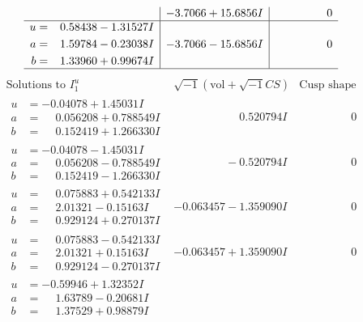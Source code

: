 \documentclass[1p]{elsarticle_modified}
\theoremstyle{definition}
\newcommand{\I}{\sqrt{-1}}
\begin{document}
$$\begin{array}{c|c|c}
 & -3.7066 + 15.6856 I & \phantom{-0.000000 } 0 \\ \hline\begin{aligned}
u &= \phantom{-}0.58438 - 1.31527 I \\
a &= \phantom{-}1.59784 - 0.23038 I \\
b &= \phantom{-}1.33960 + 0.99674 I\end{aligned}
 & -3.7066 - 15.6856 I & \phantom{-0.000000 } 0\\
 \hline 
 \end{array}$$\newpage$$\begin{array}{c|c|c}  
\text{Solutions to }I^u_{1}& \I (\text{vol} + \sqrt{-1}CS) & \text{Cusp shape}\\
 \hline 
\begin{aligned}
u &= -0.04078 + 1.45031 I \\
a &= \phantom{-}0.056208 + 0.788549 I \\
b &= \phantom{-}0.152419 + 1.266330 I\end{aligned}
 & \phantom{-0.000000 -}0.520794 I & \phantom{-0.000000 } 0 \\ \hline\begin{aligned}
u &= -0.04078 - 1.45031 I \\
a &= \phantom{-}0.056208 - 0.788549 I \\
b &= \phantom{-}0.152419 - 1.266330 I\end{aligned}
 & \phantom{-0.000000 } -0.520794 I & \phantom{-0.000000 } 0 \\ \hline\begin{aligned}
u &= \phantom{-}0.075883 + 0.542133 I \\
a &= \phantom{-}2.01321 - 0.15163 I \\
b &= \phantom{-}0.929124 + 0.270137 I\end{aligned}
 & -0.063457 - 1.359090 I & \phantom{-0.000000 } 0 \\ \hline\begin{aligned}
u &= \phantom{-}0.075883 - 0.542133 I \\
a &= \phantom{-}2.01321 + 0.15163 I \\
b &= \phantom{-}0.929124 - 0.270137 I\end{aligned}
 & -0.063457 + 1.359090 I & \phantom{-0.000000 } 0 \\ \hline\begin{aligned}
u &= -0.59946 + 1.32352 I \\
a &= \phantom{-}1.63789 - 0.20681 I \\
b &= \phantom{-}1.37529 + 0.98879 I\end{aligned}

\end{array}$$
\end{document}
